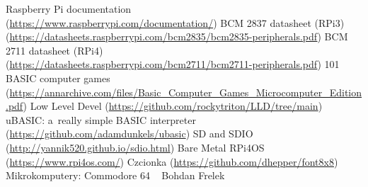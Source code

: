 \documentclass[shortabstract]{iithesis}
\begin{document}
\begin{thebibliography}{1}

\bibitem{} Raspberry Pi documentation\\(\url{https://www.raspberrypi.com/documentation/})
\bibitem{} BCM 2837 datasheet (RPi3)\\(\url{https://datasheets.raspberrypi.com/bcm2835/bcm2835-peripherals.pdf})
\bibitem{} BCM 2711 datasheet (RPi4)\\(\url{https://datasheets.raspberrypi.com/bcm2711/bcm2711-peripherals.pdf})
\bibitem{} 101 BASIC computer games\\(\url{https://annarchive.com/files/Basic_Computer_Games_Microcomputer_Edition.pdf})
\bibitem{} Low Level Devel (\url{https://github.com/rockytriton/LLD/tree/main})
\bibitem{} uBASIC: a~really simple BASIC interpreter\\ (\url{https://github.com/adamdunkels/ubasic})
\bibitem{} SD and SDIO (\url{http://yannik520.github.io/sdio.html})
\bibitem{} Bare Metal RPi4OS (\url{https://www.rpi4os.com/})
\bibitem{} Czcionka (\url{https://github.com/dhepper/font8x8})
\bibitem{} Mikrokomputery: Commodore 64 ~ Bohdan Frelek

\end{thebibliography}
\end{document}
